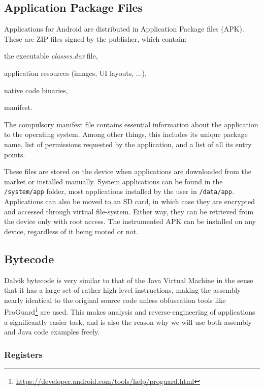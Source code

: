 \documentclass[12pt,twoside,notitlepage]{report}
\begin{document}
\subsection{Application Package Files}

Applications for Android are distributed in Application Package files (APK). These are ZIP files signed by the publisher, which contain:
\begin{inparaenum}[(i)]
\item the executable \emph{classes.dex} file,
\item application resources (images, UI layouts, ...),
\item native code binaries,
\item manifest.
\end{inparaenum}

The compulsory manifest file contains essential information about the application to the operating system. Among other things, this includes its unique package name, list of permissions requested by the application, and a list of all its entry points.

These files are stored on the device when applications are downloaded from the market or installed manually. System applications can be found in the \verb$/system/app$ folder, most applications installed by the user in \verb$/data/app$. Applications can also be moved to an SD card, in which case they are encrypted and accessed through virtual file-system. Either way, they can be retrieved from the device only with root access. The instrumented APK can be installed on any device, regardless of it being rooted or not. 

\subsection{Bytecode}

Dalvik bytecode is very similar to that of the Java Virtual Machine in the sense that it has a large set of rather high-level instructions, making the assembly nearly identical to the original source code unless obfuscation tools like ProGuard\footnote{\url{https://developer.android.com/tools/help/proguard.html}} are used. This makes analysis and reverse-engineering of applications a significantly easier task, and is also the reason why we will use both assembly and Java code examples freely.

\subsubsection{Registers}
\end{document}
